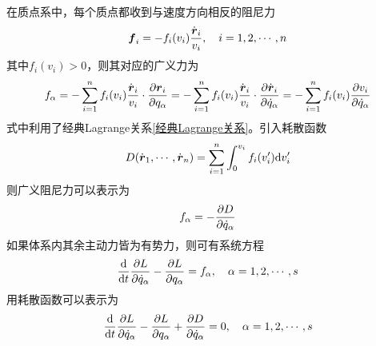 在质点系中，每个质点都收到与速度方向相反的阻尼力
\begin{equation*}
	\boldsymbol{f}_i = -f_i(v_i) \frac{\dot{\boldsymbol{r}}_i}{v_i},\quad i=1,2,\cdots,n
\end{equation*}
其中$f_i(v_i)>0$，则其对应的广义力为
\begin{equation*}
	f_\alpha = -\sum_{i=1}^n f_i(v_i) \frac{\dot{\boldsymbol{r}}_i}{v_i} \cdot \frac{\partial \boldsymbol{r}_i}{\partial q_\alpha} = -\sum_{i=1}^n f_i(v_i) \frac{\dot{\boldsymbol{r}}_i}{v_i} \cdot \frac{\partial \dot{\boldsymbol{r}}_i}{\partial \dot{q}_\alpha} = -\sum_{i=1}^n f_i(v_i) \frac{\partial v_i}{\partial \dot{q}_\alpha}
\end{equation*}
式中利用了经典Lagrange关系\eqref{经典Lagrange关系}。引入{\heiti 耗散函数}
\begin{equation}
	D(\dot{\boldsymbol{r}}_1,\cdots,\dot{\boldsymbol{r}}_n) = \sum_{i=1}^n \int_0^{v_i} f_i(v'_i) \mathrm{d} v'_i
\end{equation}
则广义阻尼力可以表示为
\begin{equation*}
	f_\alpha = -\frac{\partial D}{\partial \dot{q}_\alpha}
\end{equation*}
如果体系内其余主动力皆为有势力，则可有系统方程
\begin{equation*}
	\frac{\mathrm{d}}{\mathrm{d} t} \frac{\partial L}{\partial \dot{q}_\alpha} - \frac{\partial L}{\partial q_\alpha} = f_\alpha,\quad \alpha = 1,2,\cdots,s
\end{equation*}
用耗散函数可以表示为
\begin{equation}
	\frac{\mathrm{d}}{\mathrm{d} t} \frac{\partial L}{\partial \dot{q}_\alpha} - \frac{\partial L}{\partial q_\alpha} + \frac{\partial D}{\partial \dot{q}_\alpha} = 0,\quad \alpha=1,2,\cdots,s
	\label{阻尼系统的Lagrange方程}
\end{equation}

